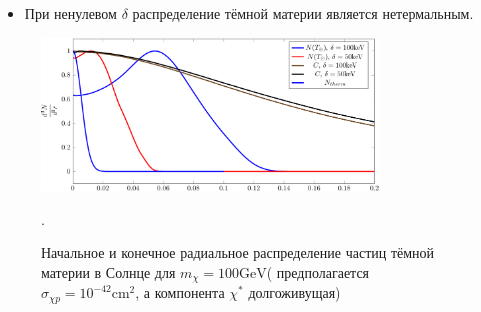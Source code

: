 \begin{itemize}
	\item При ненулевом $\delta$ распределение тёмной материи является нетермальным.
\end{itemize}
\begin{figure}[!h]
	\centering
	\includegraphics[width=0.8\textwidth]{images/Rdistribs.png}
	\caption{Начальное и конечное радиальное распределение частиц тёмной материи в Солнце для $m_{\chi} = 100\text{GeV}$( предполагается $\sigma_{\chi p} = 10^{-42} \text{cm}^2$, а компонента $\chi^*$ долгоживущая)}.
	\label{plot:Nrdistrib}
\end{figure}
